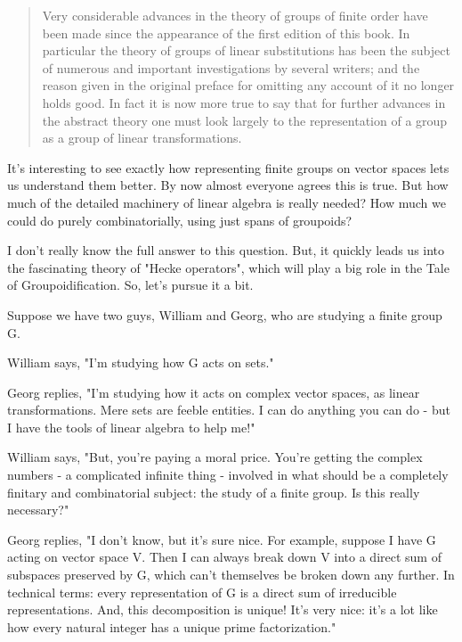\begin{quote}
   Very considerable advances in the theory of groups of finite 
   order have been made since the appearance of the first edition 
   of this book.  In particular the theory of groups of linear 
   substitutions has been the subject of numerous and important
   investigations by several writers; and the reason given in the
   original preface for omitting any account of it no longer holds
   good.  In fact it is now more true to say that for further 
   advances in the abstract theory one must look largely to the 
   representation of a group as a group of linear transformations.
\end{quote}

It's interesting to see exactly how representing finite groups on vector
spaces lets us understand them better.  By now almost everyone agrees 
this is true.  But how much of the detailed 
machinery of linear algebra is really needed?  How much we could 
do purely combinatorially, using just spans of groupoids?

I don't really know the full answer to this question.  But, it quickly
leads us into the fascinating theory of "Hecke operators", which will
play a big role in the Tale of Groupoidification.  So, let's pursue it 
a bit.

Suppose we have two guys, William and Georg, who are studying a finite
group G.  

William says, "I'm studying how G acts on sets."

Georg replies, "I'm studying how it acts on complex vector spaces, 
as linear transformations.  Mere sets are feeble entities.  I can do 
anything you can do - but I have the tools of linear algebra to help me!"

William says, "But, you're paying a moral price.  You're getting the
complex numbers - a complicated infinite thing - involved in what
should be a completely finitary and combinatorial subject: the study
of a finite group.  Is this really necessary?"

Georg replies, "I don't know, but it's sure nice.  For example,
suppose I have G acting on vector space V.  Then I can always 
break down V into a direct sum of subspaces preserved by G, which 
can't themselves be broken down any further.  In technical terms:
every representation of G is a direct sum of irreducible representations.
And, this decomposition is unique!  It's very nice: it's a lot like
how every natural integer has a unique prime factorization."

